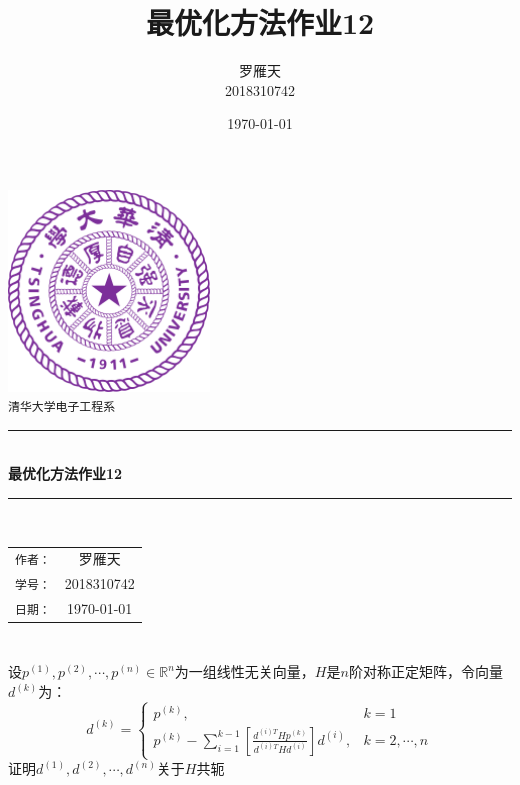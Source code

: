 \documentclass[a4paper,12pt]{article}
\title{最优化方法作业12}
\author{罗雁天 \\
2018310742}
\date{\today}
\begin{document}
\newcommand{\HRule}{\rule{\linewidth}{0.5mm}}
\begin{titlepage}
	\begin{center}
		\includegraphics[width=0.4\textwidth]{Tsinghua2.png}\\[1cm]
		\textsc{\Large \texttt{清华大学电子工程系}}\\[1cm]
		\HRule \\[1cm]
		{\Huge \bfseries 最优化方法作业12}\\[0.4cm]
		\HRule \\[3.5cm]
		\begin{minipage}{0.4\textwidth}
			\begin{center}
				\Large
				\begin{tabular}{cc}
					\texttt{作者：} & 罗雁天 \\[0.5cm]
					\texttt{学号：} & 2018310742 \\[0.5cm]
					\texttt{日期：} & \today
				\end{tabular}
			\end{center}
		\end{minipage}
		\vfill
	\end{center}
\end{titlepage}

\section{}
设$p^{(1)},p^{(2)},\cdots,p^{(n)}\in \mathbb{R}^n$为一组线性无关向量，$H$是$n$阶对称正定矩阵，令向量$d^{(k)}$为：
\begin{equation}
d^{(k)}=\left\{
\begin{array}{ll}
p^{(k)},&k=1 \\
p^{(k)}-\sum_{i=1}^{k-1}\left[\frac{d^{(i)T}Hp^{(k)}}{d^{(i)T}Hd^{(i)}}\right]d^{(i)},&k=2,\cdots,n
\end{array}
\right.
\end{equation}
证明$d^{(1)},d^{(2)},\cdots,d^{(n)}$关于$H$共轭
\end{document}
